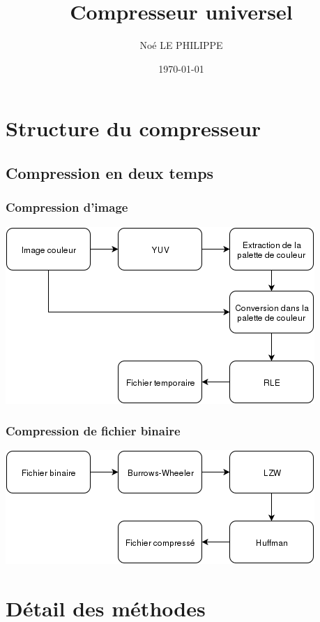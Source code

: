 \documentclass{beamer}
\title{Compresseur universel}
\author{Noé LE PHILIPPE}
\institute{Université de Montpellier}
\date{\today}
\begin{document}
\begin{frame}
  \titlepage
\end{frame}

\section{Structure du compresseur}
\subsection{Compression en deux temps}
\begin{frame}
  \frametitle{Compression d'image}
  \includegraphics[scale=0.5]{image_compress.png}
\end{frame}
\begin{frame}
  \frametitle{Compression de fichier binaire}
  \includegraphics[scale=0.5]{binary_compress.png}
\end{frame}
\section{Détail des méthodes}
\end{document}
